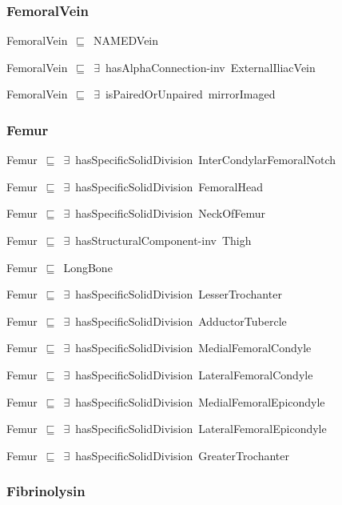 \documentclass{article}
\begin{document}
\subsubsection*{FemoralVein}

FemoralVein~\ensuremath{\sqsubseteq}~NAMEDVein~

FemoralVein~\ensuremath{\sqsubseteq}~\ensuremath{\exists}~hasAlphaConnection-inv~ExternalIliacVein~

FemoralVein~\ensuremath{\sqsubseteq}~\ensuremath{\exists}~isPairedOrUnpaired~mirrorImaged~

\subsubsection*{Femur}

Femur~\ensuremath{\sqsubseteq}~\ensuremath{\exists}~hasSpecificSolidDivision~InterCondylarFemoralNotch~

Femur~\ensuremath{\sqsubseteq}~\ensuremath{\exists}~hasSpecificSolidDivision~FemoralHead~

Femur~\ensuremath{\sqsubseteq}~\ensuremath{\exists}~hasSpecificSolidDivision~NeckOfFemur~

Femur~\ensuremath{\sqsubseteq}~\ensuremath{\exists}~hasStructuralComponent-inv~Thigh~

Femur~\ensuremath{\sqsubseteq}~LongBone~

Femur~\ensuremath{\sqsubseteq}~\ensuremath{\exists}~hasSpecificSolidDivision~LesserTrochanter~

Femur~\ensuremath{\sqsubseteq}~\ensuremath{\exists}~hasSpecificSolidDivision~AdductorTubercle~

Femur~\ensuremath{\sqsubseteq}~\ensuremath{\exists}~hasSpecificSolidDivision~MedialFemoralCondyle~

Femur~\ensuremath{\sqsubseteq}~\ensuremath{\exists}~hasSpecificSolidDivision~LateralFemoralCondyle~

Femur~\ensuremath{\sqsubseteq}~\ensuremath{\exists}~hasSpecificSolidDivision~MedialFemoralEpicondyle~

Femur~\ensuremath{\sqsubseteq}~\ensuremath{\exists}~hasSpecificSolidDivision~LateralFemoralEpicondyle~

Femur~\ensuremath{\sqsubseteq}~\ensuremath{\exists}~hasSpecificSolidDivision~GreaterTrochanter~

\subsubsection*{Fibrinolysin}
\end{document}
